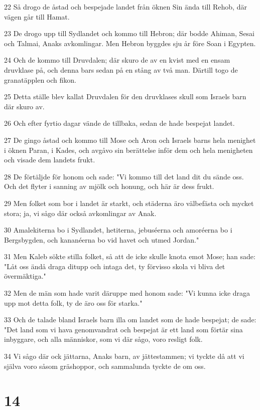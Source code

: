 \par 22 Så drogo de åstad och bespejade landet från öknen Sin ända till Rehob, där vägen går till Hamat.
\par 23 De drogo upp till Sydlandet och kommo till Hebron; där bodde Ahiman, Sesai och Talmai, Anaks avkomlingar. Men Hebron byggdes sju år före Soan i Egypten.
\par 24 Och de kommo till Druvdalen; där skuro de av en kvist med en ensam druvklase på, och denna bars sedan på en stång av två man. Därtill togo de granatäpplen och fikon.
\par 25 Detta ställe blev kallat Druvdalen för den druvklases skull som Israels barn där skuro av.
\par 26 Och efter fyrtio dagar vände de tillbaka, sedan de hade bespejat landet.
\par 27 De gingo åstad och kommo till Mose och Aron och Israels barns hela menighet i öknen Paran, i Kades, och avgåvo sin berättelse inför dem och hela menigheten och visade dem landets frukt.
\par 28 De förtäljde för honom och sade: "Vi kommo till det land dit du sände oss. Och det flyter i sanning av mjölk och honung, och här är dess frukt.
\par 29 Men folket som bor i landet är starkt, och städerna äro välbefästa och mycket stora; ja, vi sågo där också avkomlingar av Anak.
\par 30 Amalekiterna bo i Sydlandet, hetiterna, jebuséerna och amoréerna bo i Bergsbygden, och kananéerna bo vid havet och utmed Jordan."
\par 31 Men Kaleb sökte stilla folket, så att de icke skulle knota emot Mose; han sade: "Låt oss ändå draga ditupp och intaga det, ty förvisso skola vi bliva det övermäktiga."
\par 32 Men de män som hade varit däruppe med honom sade: "Vi kunna icke draga upp mot detta folk, ty de äro oss för starka."
\par 33 Och de talade bland Israels barn illa om landet som de hade bespejat; de sade: "Det land som vi hava genomvandrat och bespejat är ett land som förtär sina inbyggare, och alla människor, som vi där sågo, voro resligt folk.
\par 34 Vi sågo där ock jättarna, Anaks barn, av jättestammen; vi tyckte då att vi själva voro såsom gräshoppor, och sammalunda tyckte de om oss.

\chapter{14}


